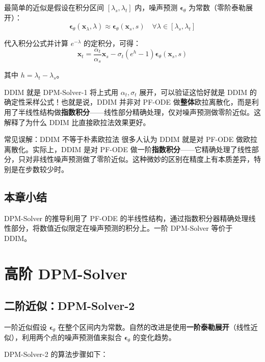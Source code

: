 \documentclass[a4paper]{article}
\begin{document}
最简单的近似是假设在积分区间 $[\lambda_s, \lambda_t]$ 内，噪声预测 $\boldsymbol{\epsilon}_\theta$ 为常数（零阶泰勒展开）：
$$\boldsymbol{\epsilon}_\theta(\mathbf{x}_\lambda, \lambda) \approx \boldsymbol{\epsilon}_\theta(\mathbf{x}_s, s) \quad \forall \lambda \in [\lambda_s, \lambda_t]$$

代入积分公式并计算 $e^{-\lambda}$ 的定积分，可得：
$$\mathbf{x}_t = \frac{\alpha_t}{\alpha_s} \mathbf{x}_s - \sigma_t (e^{h} - 1) \boldsymbol{\epsilon}_\theta(\mathbf{x}_s, s)$$

其中 $h = \lambda_t - \lambda_s$。

\begin{importantbox}{DDIM 就是 DPM-Solver-1}
将上式用 $\alpha_t, \sigma_t$ 展开，可以验证这恰好就是 DDIM 的确定性采样公式！也就是说，DDIM 并非对 PF-ODE 做\textbf{整体}欧拉离散化，而是利用了半线性结构做\textbf{指数积分}——线性部分精确处理，仅对噪声预测做零阶近似。这解释了为什么 DDIM 比直接欧拉法效果更好。
\end{importantbox}

\begin{warningbox}{常见误解：DDIM 不等于朴素欧拉法}
很多人认为 DDIM 就是对 PF-ODE 做欧拉离散化。实际上，DDIM 是对 PF-ODE 做一阶\textbf{指数积分}——它精确处理了线性部分，只对非线性噪声预测做了零阶近似。这种微妙的区别在精度上有本质差异，特别是在步数较少时。
\end{warningbox}

\subsection{本章小结}

DPM-Solver 的推导利用了 PF-ODE 的半线性结构，通过指数积分器精确处理线性部分，将数值近似限定在噪声预测的积分上。一阶 DPM-Solver 等价于 DDIM。


\section{高阶 DPM-Solver}

\subsection{二阶近似：DPM-Solver-2}

一阶近似假设 $\boldsymbol{\epsilon}_\theta$ 在整个区间内为常数。自然的改进是使用\textbf{一阶泰勒展开}（线性近似），利用两个点的噪声预测值来拟合 $\boldsymbol{\epsilon}_\theta$ 的变化趋势。

DPM-Solver-2 的算法步骤如下：
\end{document}
